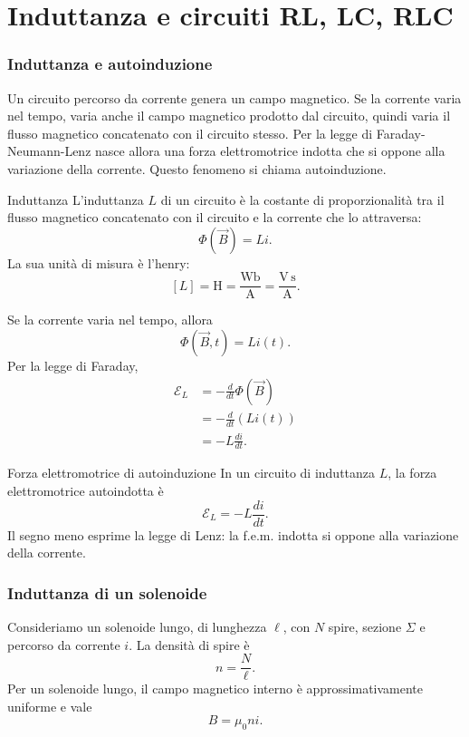 \documentclass[a4paper]{article}
\begin{document}
\pagebreak
\part{Induttanza e circuiti RL, LC, RLC}

\section{Induttanza e autoinduzione}

Un circuito percorso da corrente genera un campo magnetico. Se la corrente varia nel tempo, varia anche il campo magnetico prodotto dal circuito, quindi varia il flusso magnetico concatenato con il circuito stesso. Per la legge di Faraday-Neumann-Lenz nasce allora una forza elettromotrice indotta che si oppone alla variazione della corrente. Questo fenomeno si chiama autoinduzione.

\begin{snippetdefinition}{Induttanza}
L'induttanza \(L\) di un circuito è la costante di proporzionalità tra il flusso magnetico concatenato con il circuito e la corrente che lo attraversa:
\[
    \Phi(\vec{B})=Li.
\]
La sua unità di misura è l'henry:
\[
    [L]=\mathrm{H}=\frac{\mathrm{Wb}}{\mathrm{A}}=\frac{\mathrm{V}\,\mathrm{s}}{\mathrm{A}}.
\]
\end{snippetdefinition}

Se la corrente varia nel tempo, allora
\[
\Phi(\vec{B},t)=L i(t).
\]
Per la legge di Faraday,
\begin{align*}
\mathcal{E}_L
&=-\frac{d}{dt}\Phi(\vec{B}) \\
&=-\frac{d}{dt}\left(Li(t)\right) \\
&=-L\frac{di}{dt}.
\end{align*}

\begin{snippetproposition}{Forza elettromotrice di autoinduzione}
In un circuito di induttanza \(L\), la forza elettromotrice autoindotta è
\[
    \mathcal{E}_L=-L\frac{di}{dt}.
\]
Il segno meno esprime la legge di Lenz: la f.e.m. indotta si oppone alla variazione della corrente.
\end{snippetproposition}

\section{Induttanza di un solenoide}

Consideriamo un solenoide lungo, di lunghezza \(\ell\), con \(N\) spire, sezione \(\Sigma\) e percorso da corrente \(i\). La densità di spire è
\[
n=\frac{N}{\ell}.
\]
Per un solenoide lungo, il campo magnetico interno è approssimativamente uniforme e vale
\[
B=\mu_0 n i.
\]
\end{document}
